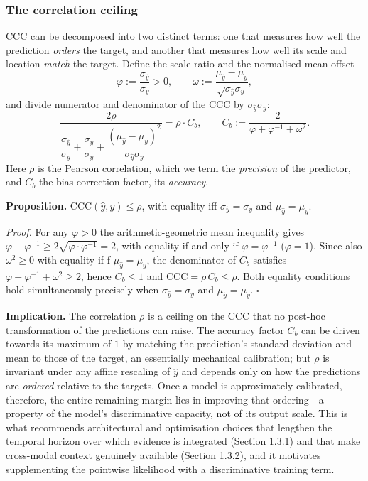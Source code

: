 \documentclass[11pt,a4paper]{article}
\begin{document}
	\subsubsection*{The correlation ceiling}
	CCC can be decomposed into two distinct terms: one that measures how well the prediction \emph{orders} the target, and another that measures how well its scale and location \emph{match} the target. Define the scale ratio and the normalised mean offset
	$$\varphi := \frac{\sigma_{\hat{y}}}{\sigma_y} > 0, \qquad \omega := \frac{\mu_{\hat{y}} - \mu_y}{\sqrt{\sigma_{\hat{y}}\sigma_y}},$$
	and divide numerator and denominator of the CCC by $\sigma_{\hat{y}}\sigma_y$:
	$$
	\frac{2\rho}{\dfrac{\sigma_{\hat{y}}}{\sigma_y} + \dfrac{\sigma_y}{\sigma_{\hat{y}}}
	+ \dfrac{(\mu_{\hat{y}}-\mu_y)^2}{\sigma_{\hat{y}}\sigma_y}}
	= \rho \cdot C_b, \qquad
	C_b := \frac{2}{\varphi + \varphi^{-1} + \omega^{2}} . $$
	Here $\rho$ is the Pearson correlation, which we term the \emph{precision} of the predictor, and $C_b$ the bias-correction factor, its \emph{accuracy}.
	
	\textbf{Proposition.} $\text{CCC}(\hat{y},y) \le \rho$, with equality iff $\sigma_{\hat{y}} = \sigma_y$ and $\mu_{\hat{y}} = \mu_y$.
	
	\textit{Proof.} For any $\varphi > 0$ the arithmetic-geometric mean inequality gives $\varphi + \varphi^{-1} \ge 2\sqrt{\varphi \cdot \varphi^{-1}} = 2$, with equality if and only if $\varphi = \varphi^{-1}$ ($\varphi = 1$). Since also $\omega^2 \ge 0$ with equality if f $\mu_{\hat{y}} = \mu_y$, the denominator of $C_b$ satisfies $\varphi + \varphi^{-1} + \omega^2 \ge 2$, hence $C_b \le 1$ and $\text{CCC} = \rho\,C_b \le \rho$. Both equality conditions hold simultaneously precisely when $\sigma_{\hat{y}} = \sigma_y$ and $\mu_{\hat{y}} = \mu_y$. $\square$
	
	\textbf{Implication.} The correlation $\rho$ is a ceiling on the CCC that no post-hoc transformation of the predictions can raise. The accuracy factor $C_b$ can be driven towards its maximum of $1$ by matching the prediction's standard deviation and mean to those of the target, an essentially mechanical calibration; but $\rho$ is invariant under any affine rescaling of $\hat{y}$ and depends only on how the predictions are \emph{ordered} relative to the targets. Once a model is approximately calibrated, therefore, the entire remaining margin lies in improving that ordering - a property of the model's discriminative capacity, not of its output scale. This is what recommends architectural and optimisation choices that lengthen the temporal horizon over which evidence is integrated (Section 1.3.1) and that make cross-modal context genuinely available (Section 1.3.2), and it motivates supplementing the pointwise likelihood with a discriminative training term.
\end{document}
